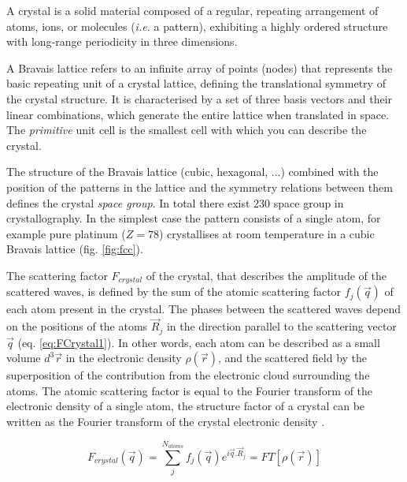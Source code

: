 A crystal is a solid material composed of a regular, repeating arrangement of atoms, ions, or molecules (\textit{i.e.} a pattern), exhibiting a highly ordered structure with long-range periodicity in three dimensions.

A Bravais lattice refers to an infinite array of points (nodes) that represents the basic repeating unit of a crystal lattice, defining the translational symmetry of the crystal structure.
It is characterised by a set of three basis vectors and their linear combinations, which generate the entire lattice when translated in space.
The \textit{primitive} unit cell is the smallest cell with which you can describe the crystal.

The structure of the Bravais lattice (cubic, hexagonal, ...) combined with the position of the patterns in the lattice and the symmetry relations between them defines the crystal \textit{space group}.
In total there exist 230 space group in crystallography.
In the simplest case the pattern consists of a single atom, for example pure platinum ($Z=78$) crystallises at room temperature in a cubic Bravais lattice (fig. \ref{fig:fcc}).

The scattering factor $F_{crystal}$ of the crystal, that describes the amplitude of the scattered waves, is defined by the sum of the atomic scattering factor $f_j(\vec{q})$ of each atom present in the crystal.
The phases between the scattered waves depend on the positions of the atoms $\vec{R}_j$ in the direction parallel to the scattering vector $\vec{q}$ (eq. \ref{eq:FCrystal1}).
In other words, each atom can be described as a small volume $d^3\vec{r}$ in the electronic density $\rho(\vec{r})$, and the scattered field by the superposition of the contribution from the electronic cloud surrounding the atoms.
The atomic scattering factor is equal to the Fourier transform of the electronic density of a single atom, the structure factor of a crystal can be written as the Fourier transform of the crystal electronic density \parencite{Paganin}.

\begin{equation}
    \label{eq:FCrystal1}
    F_{crystal}(\vec{q}) = \sum_j^{N_{atoms}} f_j(\vec{q}) e^{i\vec{q}.\vec{R}_j} = FT[\rho(\vec{r})]
\end{equation}

